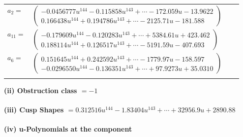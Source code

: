 \documentclass[1p]{elsarticle_modified}
\theoremstyle{definition}
\begin{document}
\begin{tabular}{m{7pt} m{180pt} m{7pt} m{180pt} }
\flushright $a_{2}=$&$\begin{pmatrix}-0.0456777 u^{144}-0.115858 u^{143}+\cdots-172.059 u-13.9622\\0.166438 u^{144}+0.194786 u^{143}+\cdots-2125.71 u-181.588\end{pmatrix}$ \\
\flushright $a_{11}=$&$\begin{pmatrix}-0.179609 u^{144}-0.120283 u^{143}+\cdots+5384.61 u+423.462\\0.188114 u^{144}+0.126517 u^{143}+\cdots-5191.59 u-407.693\end{pmatrix}$ \\
\flushright $a_{6}=$&$\begin{pmatrix}0.151645 u^{144}+0.242592 u^{143}+\cdots-1779.97 u-158.597\\-0.0296550 u^{144}-0.136351 u^{143}+\cdots+97.9273 u+35.0310\end{pmatrix}$\\&\end{tabular}
\flushleft \textbf{(ii) Obstruction class $= -1$}\\~\\
\flushleft \textbf{(iii) Cusp Shapes $= 0.312516 u^{144}-1.83404 u^{143}+\cdots+32956.9 u+2890.88$}\\~\\
\newpage\renewcommand{\arraystretch}{1}
\flushleft \textbf{(iv) u-Polynomials at the component}\newline \\
\end{document}
